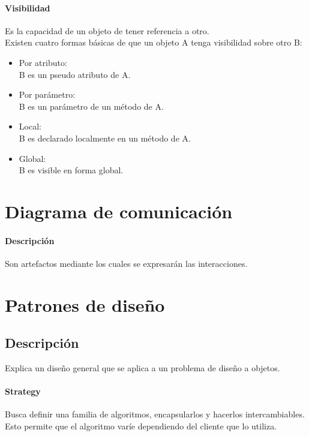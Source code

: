 \documentclass[a4paper,12pt,oneside]{report}
\begin{document}
        \paragraph{Visibilidad}
          Es la capacidad de un objeto de tener referencia a otro.\\
          Existen cuatro formas b\'asicas de que un objeto A tenga visibilidad sobre otro B:
          \begin{itemize}
            \item Por atributo:\\
                    B es un pseudo atributo de A.
            \item Por par\'ametro:\\
                    B es un par\'ametro de un m\'etodo de A.
            \item Local:\\
                    B es declarado localmente en un m\'etodo de A.
            \item Global:\\
                    B es visible en forma global.
          \end{itemize}


    \section{Diagrama de comunicaci\'on}
        \paragraph{Descripci\'on}
          Son artefactos mediante los cuales se expresar\'an las
          interacciones.


    \section{Patrones de dise\~no}
      \subsection{Descripci\'on}
        Explica un dise\~no general que se aplica a un problema de dise\~no a
        objetos.

        \paragraph{Strategy}
          Busca definir una familia de algoritmos, encapsularlos y hacerlos
          intercambiables.\\
          Esto  permite que el algoritmo var\'ie dependiendo del cliente que lo utiliza.
\end{document}
